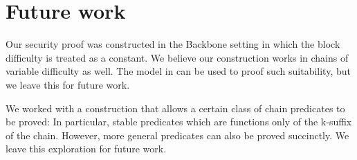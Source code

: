 \section{Future work}

Our security proof was constructed in the Backbone \cite{backbone} setting in
which the block difficulty is treated as a constant. We believe our
construction works in chains of variable difficulty as well. The model in
\cite{backbone2} can be used to proof such suitability, but we leave this for
future work.

We worked with a construction that allows a certain class of chain predicates
to be proved: In particular, stable predicates which are functions only of the
k-suffix of the chain. However, more general predicates can also be proved
succinctly. We leave this exploration for future work.
